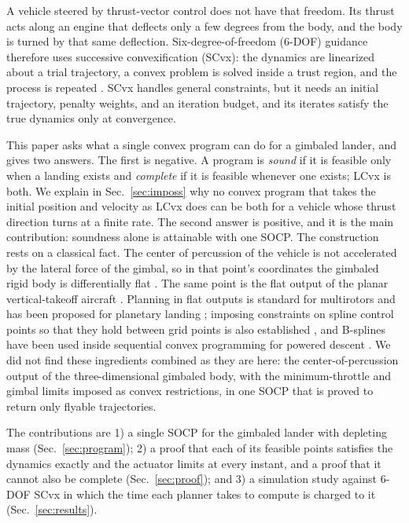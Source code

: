 \documentclass[10pt,letterpaper]{article}
\theoremstyle{aiaa}
\begin{document}
A vehicle steered by thrust-vector control does not have that freedom. Its thrust acts along an engine that deflects only a
few degrees from the body, and the body is turned by that same deflection. Six-degree-of-freedom (6-DOF) guidance therefore
uses successive convexification (SCvx): the dynamics are linearized about a trial trajectory, a convex problem is solved inside
a trust region, and the process is repeated \cite{mao2016,szmuk2018,szmuk2020}. SCvx handles general constraints, but it needs
an initial trajectory, penalty weights, and an iteration budget, and its iterates satisfy the true dynamics only at convergence.

This paper asks what a single convex program can do for a gimbaled lander, and gives two answers. The first is negative. A
program is \emph{sound} if it is feasible only when a landing exists and \emph{complete} if it is feasible whenever one exists;
LCvx is both. We explain in Sec.~\ref{sec:imposs} why no convex program that takes the initial position and velocity as LCvx
does can be both for a vehicle whose thrust direction turns at a finite rate. The second answer is positive, and it is the main
contribution: soundness alone is attainable with one SOCP. The construction rests on a classical fact. The center of percussion
of the vehicle is not accelerated by the lateral force of the gimbal, so in that point's coordinates the gimbaled rigid body is
differentially flat \cite{fliess1995}. The same point is the flat output of the planar vertical-takeoff aircraft
\cite{martin1996}. Planning in flat outputs is standard for multirotors \cite{mellinger2011} and has been proposed for planetary
landing \cite{desiderio2013}; imposing constraints on spline control points so that they hold between grid points is also
established \cite{vanloock2015}, and B-splines have been used inside sequential convex programming for powered descent
\cite{wang2026}. We did not find these ingredients combined as they are here: the center-of-percussion output of the
three-dimensional gimbaled body, with the minimum-throttle and gimbal limits imposed as convex restrictions, in one SOCP that
is proved to return only flyable trajectories.

The contributions are 1) a single SOCP for the gimbaled lander with depleting mass (Sec.~\ref{sec:program}); 2) a proof that
each of its feasible points satisfies the dynamics exactly and the actuator limits at every instant, and a proof that it cannot
also be complete (Sec.~\ref{sec:proof}); and 3) a simulation study against 6-DOF SCvx in which the time each planner takes to
compute is charged to it (Sec.~\ref{sec:results}).
\end{document}
